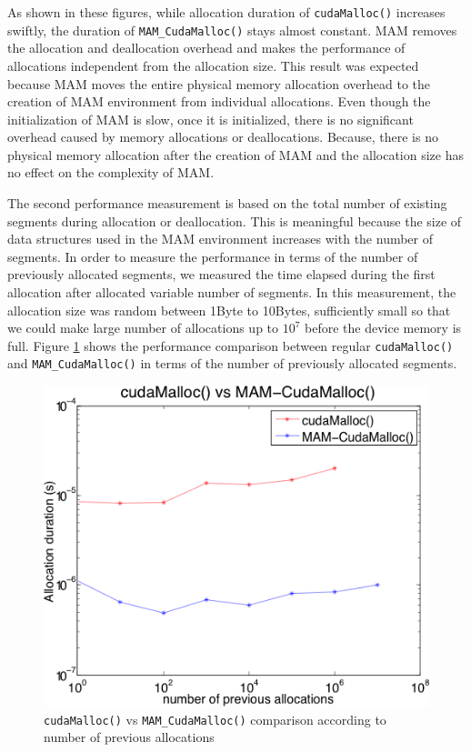 \documentclass[conference]{IEEEtran}
\def\code#1{\texttt{#1}}
\begin{document}
As shown in these figures, while allocation duration of \code{cudaMalloc()} increases swiftly, the duration of \code{MAM\_CudaMalloc()} stays almost constant. MAM removes the allocation and deallocation overhead and makes the performance of allocations independent from the allocation size. This result was expected because MAM moves the entire physical memory allocation overhead to the creation of MAM environment from individual allocations. Even though the initialization of MAM is slow, once it is initialized, there is no significant overhead caused by memory allocations or deallocations. Because, there is no physical memory allocation after the creation of MAM and the allocation size has no effect on the complexity of MAM.

The second performance measurement is based on the total number of existing segments during allocation or deallocation. This is meaningful because the size of data structures used in the MAM environment increases with the number of segments. 
In order to measure the performance in terms of the number of previously allocated segments, we measured the time elapsed during the first allocation after allocated variable number of segments. In this measurement, the allocation size was random between 1Byte to 10Bytes, sufficiently small so that we could make large number of allocations up to $10^7$ before the device memory is full. Figure \ref{fig:cm-mcm-pa} shows the performance comparison between regular \code{cudaMalloc()} and \code{MAM\_CudaMalloc()} in terms of the number of previously allocated segments. 

\begin{figure}[h!]
\centering
  \includegraphics[width=0.8\linewidth]{cudamalloc-vs-mamcudamalloc-pa.png}
  \caption{\code{cudaMalloc()} vs \code{MAM\_CudaMalloc()} comparison according to number of previous allocations}
  \label{fig:cm-mcm-pa}
\end{figure}
\end{document}

